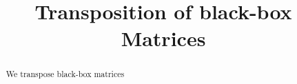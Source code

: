 \documentclass{article}
\title{Transposition of black-box Matrices}
\begin{document}
\maketitle

\begin{abstract}
  We transpose black-box matrices
\end{abstract}










\appendix

\end{document}
